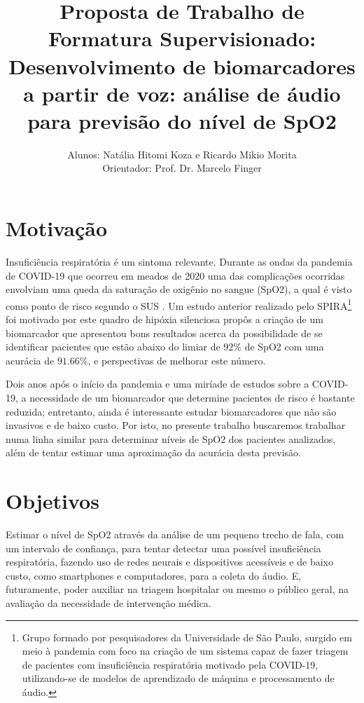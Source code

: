 \documentclass[12pt, a4paper]{article}
\begin{document}
\title{Proposta de Trabalho de Formatura Supervisionado: \textbf{Desenvolvimento de biomarcadores a partir de voz: análise de áudio para previsão do nível de SpO2}}

\author{Alunos: Natália Hitomi Koza e Ricardo Mikio Morita \\ Orientador: Prof. Dr. Marcelo Finger}
\maketitle

\section{Motivação}
Insuficiência respiratória é um sintoma relevante. Durante as ondas da pandemia de COVID-19 que ocorreu em meados de 2020 uma das complicações ocorridas envolviam uma queda da saturação de oxigênio no sangue (SpO2), a qual é visto como ponto de risco segundo o SUS \cite{manualcovid}. Um estudo anterior realizado pelo SPIRA\footnote{Grupo formado por pesquisadores da Universidade de São Paulo, surgido em meio à pandemia com foco na criação de um sistema capaz de fazer triagem de pacientes com insuficiência respiratória motivado pela COVID-19, utilizando-se de modelos de aprendizado de máquina e processamento de áudio.} foi motivado por este quadro de hipóxia silenciosa \citep{casanova2021deep} propôs a criação de um biomarcador que apresentou bons resultados acerca da possibilidade de se identificar pacientes que estão abaixo do limiar de $92\%$ de SpO2 com uma acurácia de $91.66\%$, e perspectivas de melhorar este número.

Dois anos após o início da pandemia e uma miríade de estudos sobre a COVID-19, a necessidade de um biomarcador que determine pacientes de risco é bastante reduzida; entretanto, ainda é interessante estudar biomarcadores que não são invasivos e de baixo custo. Por isto, no presente trabalho buscaremos trabalhar numa linha similar para determinar níveis de SpO2 dos pacientes analizados, além de tentar estimar uma aproximação da acurácia desta previsão.

\section{Objetivos}

Estimar o nível de SpO2 através da análise de um pequeno trecho de fala, com um intervalo de confiança, para tentar detectar uma possível insuficiência respiratória, fazendo uso de redes neurais e dispositivos acessíveis e de baixo custo, como smartphones e computadores, para a coleta do áudio. E, futuramente, poder auxiliar na triagem hospitalar ou mesmo o público geral, na avaliação da necessidade de intervenção médica.
\end{document}
